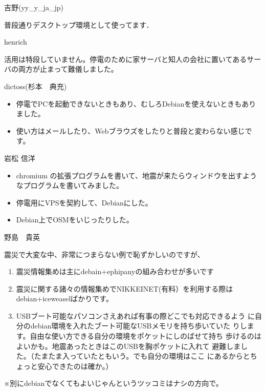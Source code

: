

\begin{prework}{ 吉野(yy\_y\_ja\_jp) }

普段通りデスクトップ環境として使ってます．
\end{prework}

\begin{prework}{ henrich }

活用は特段していません。停電のために家サーバと知人の会社に置いてあるサーバの両方が止まって難儀しました。
\end{prework}

\begin{prework}{ dictoss(杉本　典充) }

 \begin{itemize}
  \item 停電でPCを起動できないときもあり、むしろDebianを使えないときもありました。
  \item 使い方はメールしたり、Webブラウズをしたりと普段と変わらない感じで
	す。
 \end{itemize}
\end{prework}

\begin{prework}{ 岩松 信洋 }

 \begin{itemize}
  \item chromium の拡張プログラムを書いて、地震が来たらウィンドウを出すようなプログラムを書いてみました。
  \item 停電用にVPSを契約して、Debianにした。
  \item Debian上でOSMをいじったりした。
 \end{itemize}
 
\end{prework}

\begin{prework}{ 野島　貴英 }

震災で大変な中、非常につまらない例で恥ずかしいのですが、

 \begin{enumerate}
  \item 震災情報集めは主にdebain+ephipanyの組み合わせが多いです
  \item 震災に関する諸々の情報集めでNIKKEINET(有料）を利用する際はdebian+iceweaselばかりです。
  \item USBブート可能なパソコンさえあれば有事の際どこでも対応できるよう
	に自分のdebian環境を入れたブート可能なUSBメモリを持ち歩いていた
	りします。自由な使い方できる自分の環境をポケットにしのばせて持ち
	歩けるのはよいかも。地震あったときはこのUSBを胸ポケットに入れて
	避難しました。（たまたま入っていたともいう。でも自分の環境はここ
	にあるからとちょっと安心できたのは確か。）
 \end{enumerate}
 ※別にdebianでなくてもよいじゃんというツッコミはナシの方向で。
\end{prework}


